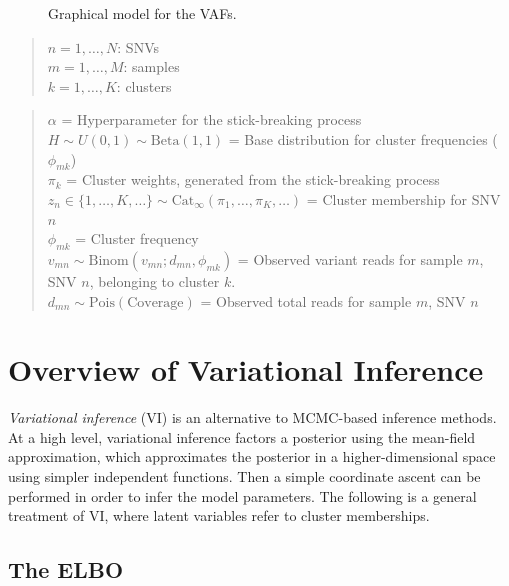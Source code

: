 \documentclass[11pt]{article}
\newcommand{\adjustimg}{%
  \checkoddpage%
  \ifoddpage\hspace*{\dimexpr\evensidemargin-\oddsidemargin}\else\hspace*{-\dimexpr\evensidemargin-\oddsidemargin}\fi%
}
\newcommand{\centerimg}[2][width=\textwidth]{%
  \makebox[\textwidth]{\adjustimg\texttt{[image: \#2]}}%
}
\begin{document}
\begin{figure}[h]
\centerimg[scale=1.0]{multi_pgm.png}
\caption{Graphical model for the VAFs.}
\label{fig:GM}
\end{figure}

\begin{quote}
$n = 1, \ldots , N$:  SNVs \\
$m = 1, \ldots , M$: samples \\
$k = 1, \ldots ,  K$: clusters
\end{quote}

\begin{quote}
$\alpha$ = Hyperparameter for the stick-breaking process \\[2pt]
$H \sim U(0,1) \sim \mathrm{Beta}(1, 1)$ = Base distribution for cluster frequencies ($\phi_{mk}$)	 \\[2pt]
$\pi_k$ =  Cluster weights, generated from the stick-breaking process \\[2pt]
$z_{n} \in \{1, \ldots, K, \ldots \}  \sim \mathrm{Cat}_\infty(\pi_1, \ldots, \pi_K, \ldots)$ =  Cluster membership for SNV $n$\\[2pt]
$\phi_{mk}$ = Cluster frequency \\ [2pt]
$v_{mn} \sim \mathrm{Binom}(v_{mn}; d_{mn}, \phi_{mk})$ = {\smaller Observed variant reads for sample $m$, SNV $n$, belonging to cluster $k$.} \\ [2pt]
$d_{mn} \sim \mathrm{Pois}(\text{Coverage})$ = Observed total reads for sample $m$, SNV $n$
\end{quote}
\vspace{0.05cm}


\section{Overview of Variational Inference}

\emph{Variational inference} (VI) is an alternative to MCMC-based inference methods. At a high level, variational inference factors a posterior using the mean-field approximation, which approximates the posterior in a higher-dimensional space using simpler independent functions. Then a simple coordinate ascent can be performed in order to infer the model parameters. The following is a general treatment of VI, where latent variables refer to cluster memberships.

\subsection{The \textsc{ELBO}}
\end{document}
